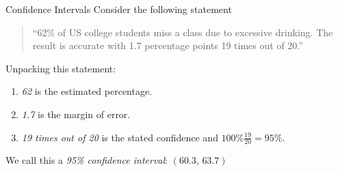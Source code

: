 \documentclass[xcolor=svgnames, 10pt, handout]{beamer}
\begin{document}


\begin{frame}[fragile]{Confidence Intervals}
Consider the following statement
\begin{quotation}
``62\% of US college students miss a class due to excessive drinking.  The result is accurate with 1.7 percentage points 19 times out of 20.''
\end{quotation}
\vfill
Unpacking this statement:
\begin{enumerate}
\item \emph{62} is the estimated percentage.
\item \emph{1.7} is the margin of error.
\item \emph{19 times out of 20} is the stated confidence and $100\% \frac{19}{20} = 95\%$.
\end{enumerate}
\vfill
We call this a \emph{95\% confidence interval}: $(60.3,\, 63.7)$
\vfill
\end{frame}
\end{document}
